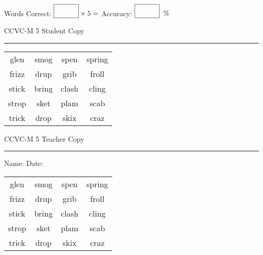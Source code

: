 \documentclass{memoir}
\begin{document}
\small

Words Correct: $\fbox{\phantom{\huge 100}} \times 5 = $ Accuracy: $\fbox{\phantom{\huge 100}}\;\; \%$ 

\vfill

\newpage


\footnotesize \noindent
CCVC-M 5 \hfill Student Copy
\smallskip
\hrule

\Large

\setlength{\tabcolsep}{14pt}
\def\arraystretch{3}

{\selectfont


\begin{vplace}[0.5]
\begin{center}
\begin{tabular}{cccc}
glen & smog & spen & spring \\
frizz & drup & grib                    & froll \\
stick & bring      & clash            & cling \\
strop & sket & plam & scab \\
trick & drop & skix & craz        \\
\end{tabular}
\end{center}
\end{vplace}

}

\newpage

\footnotesize \noindent
CCVC-M 5 \hfill Teacher Copy
\smallskip
\hrule

\small

\vfill

\noindent
Name: \underline{\hspace{1.75in}} \hfill Date: \underline{\hspace{1in}}

\Large

{\selectfont


\begin{vplace}[0.5]
\begin{center}
\begin{tabular}{cccc}
glen & smog & spen & spring \\
frizz & drup & grib                    & froll \\
stick & bring      & clash            & cling \\
strop & sket & plam & scab \\
trick & drop & skix & craz        \\
\end{tabular}
\end{center}
\end{vplace}



}
\end{document}
